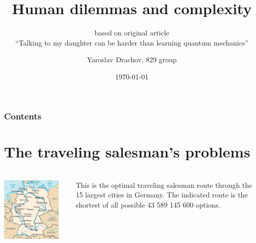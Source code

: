 \documentclass[c]{beamer}
\title{Human dilemmas and complexity}
\subtitle{based on original article\\
``Talking to my daughter can be harder than learning quantum mechanics''}
\author{Yaroslav Drachov, 829 group}
\date{\today}
\institute[MIPT]{Moscow Institute of Physics and Technology}
\begin{document}
  
%
\frame{\titlepage}
\begin{frame}
	\frametitle{Contents}
\tableofcontents
\end{frame}
\section{The traveling salesman’s problems}
\begin{frame}
	\frametitle{\insertsection}
	\begin{columns}
		\includegraphics[width=0.9\textwidth]{1}

This is the optimal traveling salesman route through the 15 largest cities in Germany. The indicated route is the shortest of all possible 43 589 145 600 options.
	\end{columns}
\end{frame}
\end{document}
